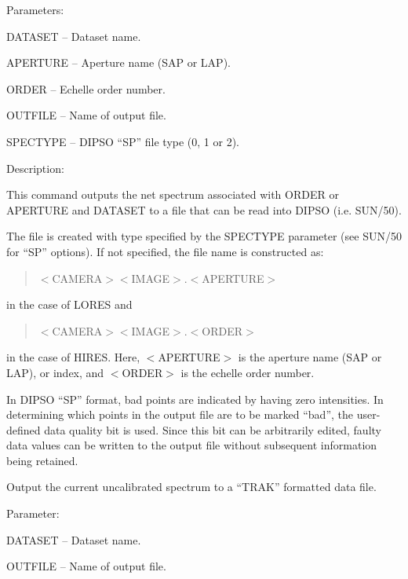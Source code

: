 \begin {description}
\begin {description}
\item Parameters:

\begin {description}
\item DATASET -- Dataset name.
\item APERTURE -- Aperture name (SAP or LAP).
\item ORDER -- Echelle order number.
\item OUTFILE -- Name of output file.
\item SPECTYPE -- DIPSO ``SP'' file type (0, 1 or 2).
\end {description}

\item Description:

This command outputs the net spectrum associated with ORDER or APERTURE
and DATASET to a file that can be read into DIPSO (i.e. SUN/50).

The file is created with type specified
by the SPECTYPE parameter (see SUN/50 for ``SP'' options).
If not specified, the file name is constructed as:

\begin {quote}
$<$CAMERA$><$IMAGE$>.<$APERTURE$>$
\end {quote}
in the case of LORES and

\begin {quote}
$<$CAMERA$><$IMAGE$>.<$ORDER$>$
\end {quote}
in the case of HIRES.
Here, $<$APERTURE$>$ is the aperture name (SAP or LAP), or index, and
$<$ORDER$>$ is the echelle order number.

In DIPSO ``SP'' format, bad points are indicated by having zero intensities.
In determining which points in the output file are to be marked
``bad'', the user-defined data quality bit is used.
Since this bit can be arbitrarily edited,
faulty data values can be written to the output file 
without subsequent information being retained.
\end {description}

\item [OUTRAK]
Output the current uncalibrated spectrum to a ``TRAK'' formatted data file.

\begin {description}
\item Parameter:

\begin {description}
\item DATASET -- Dataset name.
\item OUTFILE -- Name of output file.
\end {description}


\end{description}
\end{description}
